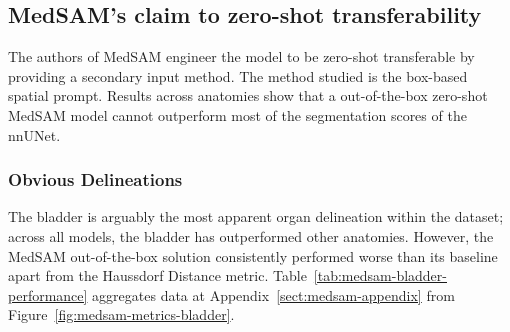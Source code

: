 \documentclass[11pt,twoside]{report}
\begin{document}
\subsection{MedSAM's claim to zero-shot transferability}

The authors of MedSAM engineer the model to be zero-shot transferable by providing a secondary input method. The method studied is the box-based spatial prompt. Results across anatomies show that a out-of-the-box zero-shot MedSAM model cannot outperform most of the segmentation scores of the nnUNet.

\subsubsection{Obvious Delineations}\label{sec:medsam-ootb-obvious-delineations}

The bladder is arguably the most apparent organ delineation within the dataset; across all models, the bladder has outperformed other anatomies. However, the MedSAM out-of-the-box solution consistently performed worse than its baseline apart from the Haussdorf Distance metric. Table~\ref{tab:medsam-bladder-performance} aggregates data at Appendix~\ref{sect:medsam-appendix} from Figure~\ref{fig:medsam-metrics-bladder}.

\begin{table}[h!]
  \centering
  \caption{Performance of models on the bladder delineation.}
  \label{tab:medsam-bladder-performance}
\end{table}
\end{document}

